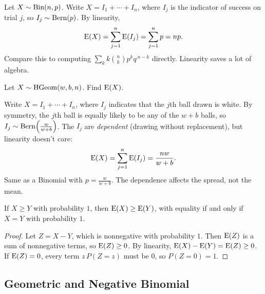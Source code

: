 \bigskip

\begin{example}\label{ex:binE}
Let $X \sim \operatorname{Bin}(n, p)$. Write $X = I_1 + \cdots + I_n$, where $I_j$ is the indicator of success on trial $j$, so $I_j \sim \operatorname{Bern}(p)$. By linearity,
\medskip
\[
\operatorname{E}(X) = \sum_{j=1}^{n} \operatorname{E}(I_j) = \sum_{j=1}^{n} p = np.
\]
\medskip
Compare this to computing $\sum_{k} k \binom{n}{k}p^{k}q^{\,n-k}$ directly. Linearity saves a lot of algebra.
\end{example}

\bigskip

\begin{example}\label{ex:hgeomE}
Let $X \sim \operatorname{HGeom}(w, b, n)$. Find $\operatorname{E}(X)$.
\end{example}

\medskip

\begin{solution}
Write $X = I_1 + \cdots + I_n$, where $I_j$ indicates that the $j$th ball drawn is white. By symmetry, the $j$th ball is equally likely to be any of the $w + b$ balls, so $I_j \sim \operatorname{Bern}\!\left(\frac{w}{w+b}\right)$. The $I_j$ are \emph{dependent} (drawing without replacement), but linearity doesn't care:
\medskip
\[
\operatorname{E}(X) = \sum_{j=1}^{n} \operatorname{E}(I_j) = \frac{nw}{w + b}.
\]
\medskip
Same as a Binomial with $p = \frac{w}{w+b}$. The dependence affects the spread, not the mean.
\end{solution}

\bigskip

\begin{proposition}\label{prop:monotone}
If $X \ge Y$ with probability $1$, then $\operatorname{E}(X) \ge \operatorname{E}(Y)$, with equality if and only if $X = Y$ with probability $1$.
\end{proposition}

\medskip

\begin{proof}
Let $Z = X - Y$, which is nonnegative with probability $1$. Then $\operatorname{E}(Z)$ is a sum of nonnegative terms, so $\operatorname{E}(Z) \ge 0$. By linearity, $\operatorname{E}(X) - \operatorname{E}(Y) = \operatorname{E}(Z) \ge 0$. If $\operatorname{E}(Z) = 0$, every term $z\,P(Z = z)$ must be $0$, so $P(Z = 0) = 1$.
\end{proof}

\bigskip

\subsection{Geometric and Negative Binomial}

